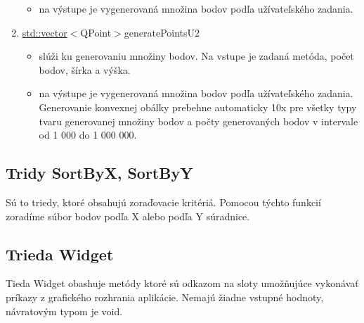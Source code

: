 \documentclass[12pt]{article}
\begin{document}
\begin{enumerate}
\begin{itemize}
\item na výstupe je vygenerovaná množina bodov podľa užívateľského zadania.
\end{itemize}
\item[] \underline {std::vector}$<${QPoint}$>${generatePointsU2}
\begin{itemize}
\item slúži ku generovaniu množiny bodov. Na vstupe je zadaná metóda, počet bodov, šírka a výška.
\item na výstupe je vygenerovaná množina bodov podľa užívateľského zadania. Generovanie konvexnej obálky prebehne automaticky 10x pre všetky typy tvaru generovanej množiny bodov a počty generovaných bodov v intervale od 1 000 do 1 000 000.
\end{itemize}
\end{enumerate}

\subsection{Tridy SortByX, SortByY}
Sú to triedy, ktoré obsahujú zoraďovacie kritériá. Pomocou týchto funkcií zoradíme súbor bodov podľa X alebo podľa Y súradnice.

\subsection{Trieda Widget}
Tieda Widget obashuje metódy ktoré sú odkazom na sloty umožňujúce vykonávať príkazy z grafického rozhrania aplikácie. Nemajú žiadne vstupné hodnoty, návratovým typom je void.
\end{document}
